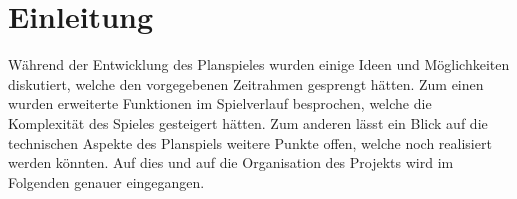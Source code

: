 \section{Einleitung}
\label{sec:fazit-einleitung}

Während der Entwicklung des Planspieles wurden einige Ideen und Möglichkeiten diskutiert, welche den vorgegebenen Zeitrahmen gesprengt hätten. Zum einen wurden erweiterte Funktionen im Spielverlauf besprochen, welche die Komplexität des Spieles gesteigert hätten. Zum anderen lässt ein Blick auf die technischen Aspekte des Planspiels weitere Punkte offen, welche noch realisiert werden könnten. Auf dies und auf die Organisation des Projekts wird im Folgenden genauer eingegangen. 
